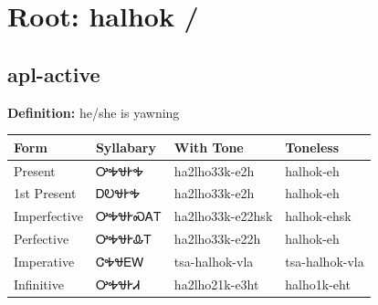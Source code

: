 \documentclass{article}%
\begin{document}
%
\normalsize%
\section*{Root: halhok / }%
\subsection*{apl-active}%
\textbf{Definition: }%
he/she is yawning%
\\[0.5em]%
\begin{tabular}{|l|l|l|l|}%
\hline%
\textbf{Form}&\textbf{Syllabary}&\textbf{With Tone}&\textbf{Toneless}\\%
\hline%
Present&ᎤᎭᏠᎨᎭ&ha2lho33k{-}e2h&halhok{-}eh\\%
1st Present&ᎠᎧᏠᎨᎭ&ha2lho33k{-}e2h&halhok{-}eh\\%
Imperfective&ᎤᎭᏠᎨᏍᎪᎢ&ha2lho33k{-}e22hsk&halhok{-}ehsk\\%
Perfective&ᎤᎭᏠᎨᎲᎢ&ha2lho33k{-}e22h&halhok{-}eh\\%
Imperative&ᏣᎭᏠᎬᎳ&tsa{-}halhok{-}vla&tsa{-}halhok{-}vla\\%
Infinitive&ᎤᎭᏠᎨᏗ&ha2lho21k{-}e3ht&halho1k{-}eht\\%
\hline%
\end{tabular}%
\\[1em]%
\end{document}
